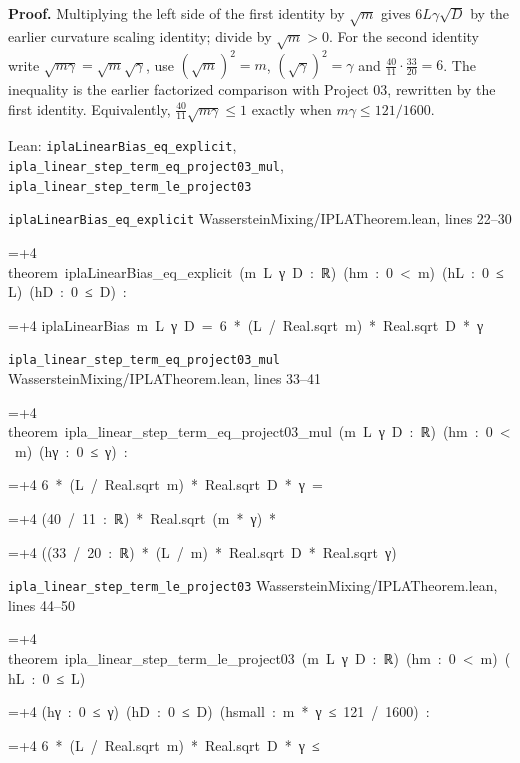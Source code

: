 \documentclass[11pt,a4paper]{report}
\newlength{\leancharwidth}
\newenvironment{leancode}{\par\smallskip\begingroup\ttfamily\footnotesize\raggedright
  \settowidth{\leancharwidth}{M}\setlength{\parskip}{0pt}\setlength{\parindent}{0pt}
  \frenchspacing}{\par\endgroup\smallskip}
\newcommand{\leanline}[2]{\hangindent=\dimexpr#1\leancharwidth+4\leancharwidth\relax
  \hangafter=1\noindent\hspace*{#1\leancharwidth}#2\par}
\newcommand{\leansource}[1]{\par{\footnotesize\color{leanmuted}#1}\par}
\begin{document}
\textbf{Proof.} Multiplying the left side of the first identity by \(\sqrt m\) gives \(6L\gamma\sqrt D\) by the earlier curvature scaling identity; divide by \(\sqrt m>0\). For the second identity write \(\sqrt{m\gamma}=\sqrt m\sqrt\gamma\), use \((\sqrt m)^2=m\), \((\sqrt\gamma)^2=\gamma\) and \(\frac{40}{11}\cdot\frac{33}{20}=6\). The inequality is the earlier factorized comparison with Project 03, rewritten by the first identity. Equivalently, \(\frac{40}{11}\sqrt{m\gamma}\le1\) exactly when \(m\gamma\le121/1600\).

\begin{leanbox}{Lean: \texttt{iplaLinearBias\_\allowbreak{}eq\_\allowbreak{}explicit}, \texttt{ipla\_\allowbreak{}linear\_\allowbreak{}step\_\allowbreak{}term\_\allowbreak{}eq\_\allowbreak{}project03\_\allowbreak{}mul}, \texttt{ipla\_\allowbreak{}linear\_\allowbreak{}step\_\allowbreak{}term\_\allowbreak{}le\_\allowbreak{}project03}}
\leansource{\texttt{iplaLinearBias\_\allowbreak{}eq\_\allowbreak{}explicit} \quad WassersteinMixing/\allowbreak{}IPLATheorem.lean, lines 22–30}
\begin{leancode}
\leanline{0}{theorem\ iplaLinearBias\_eq\_explicit\ (m\ L\ γ\ D\ :\ ℝ)\ (hm\ :\ 0\ <\ m)\ (hL\ :\ 0\ ≤\ L)\ (hD\ :\ 0\ ≤\ D)\ :}
\leanline{4}{iplaLinearBias\ m\ L\ γ\ D\ =\ 6\ *\ (L\ /\ Real.sqrt\ m)\ *\ Real.sqrt\ D\ *\ γ}
\end{leancode}
\leansource{\texttt{ipla\_\allowbreak{}linear\_\allowbreak{}step\_\allowbreak{}term\_\allowbreak{}eq\_\allowbreak{}project03\_\allowbreak{}mul} \quad WassersteinMixing/\allowbreak{}IPLATheorem.lean, lines 33–41}
\begin{leancode}
\leanline{0}{theorem\ ipla\_linear\_step\_term\_eq\_project03\_mul\ (m\ L\ γ\ D\ :\ ℝ)\ (hm\ :\ 0\ <\ m)\ (hγ\ :\ 0\ ≤\ γ)\ :}
\leanline{4}{6\ *\ (L\ /\ Real.sqrt\ m)\ *\ Real.sqrt\ D\ *\ γ\ =}
\leanline{6}{(40\ /\ 11\ :\ ℝ)\ *\ Real.sqrt\ (m\ *\ γ)\ *}
\leanline{8}{((33\ /\ 20\ :\ ℝ)\ *\ (L\ /\ m)\ *\ Real.sqrt\ D\ *\ Real.sqrt\ γ)}
\end{leancode}
\leansource{\texttt{ipla\_\allowbreak{}linear\_\allowbreak{}step\_\allowbreak{}term\_\allowbreak{}le\_\allowbreak{}project03} \quad WassersteinMixing/\allowbreak{}IPLATheorem.lean, lines 44–50}
\begin{leancode}
\leanline{0}{theorem\ ipla\_linear\_step\_term\_le\_project03\ (m\ L\ γ\ D\ :\ ℝ)\ (hm\ :\ 0\ <\ m)\ (hL\ :\ 0\ ≤\ L)}
\leanline{4}{(hγ\ :\ 0\ ≤\ γ)\ (hD\ :\ 0\ ≤\ D)\ (hsmall\ :\ m\ *\ γ\ ≤\ 121\ /\ 1600)\ :}
\leanline{4}{6\ *\ (L\ /\ Real.sqrt\ m)\ *\ Real.sqrt\ D\ *\ γ\ ≤}

\end{leancode}
\end{leanbox}
\end{document}

